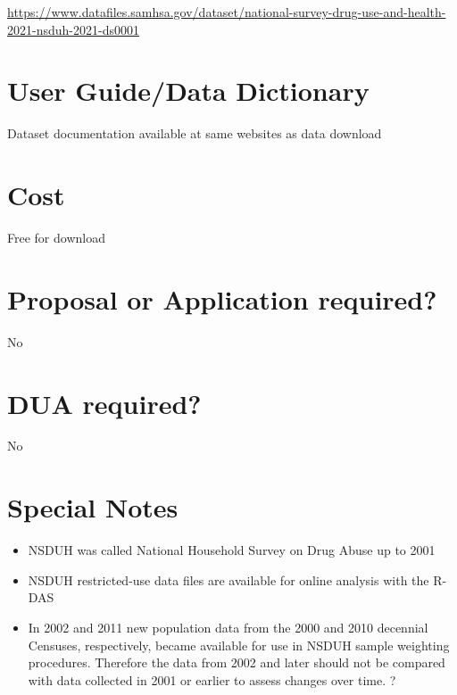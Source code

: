 \documentclass[
]{book}
\providecommand{\tightlist}{%
  \setlength{\itemsep}{0pt}\setlength{\parskip}{0pt}}
\begin{document}
\url{https://www.datafiles.samhsa.gov/dataset/national-survey-drug-use-and-health-2021-nsduh-2021-ds0001}

\hypertarget{user-guidedata-dictionary-65}{%
\section{User Guide/Data Dictionary}\label{user-guidedata-dictionary-65}}

Dataset documentation available at same websites as data download

\hypertarget{cost-65}{%
\section{Cost}\label{cost-65}}

Free for download

\hypertarget{proposal-or-application-required-65}{%
\section{Proposal or Application required?}\label{proposal-or-application-required-65}}

No

\hypertarget{dua-required-65}{%
\section{DUA required?}\label{dua-required-65}}

No

\hypertarget{special-notes-65}{%
\section{Special Notes}\label{special-notes-65}}

\begin{itemize}
\tightlist
\item
  NSDUH was called National Household Survey on Drug Abuse up to 2001
\item
  NSDUH restricted-use data files are available for online analysis with the R-DAS
\item
  In 2002 and 2011 new population data from the 2000 and 2010 decennial Censuses, respectively, became available for use in NSDUH sample weighting procedures. Therefore the data from 2002 and later should not be compared with data collected in 2001 or earlier to assess changes over time. ?
\end{itemize}
\end{document}
